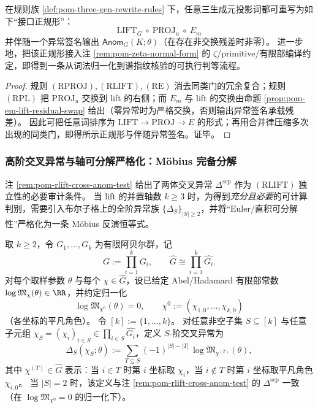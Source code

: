 \begin{proposition}\label{prop:pom-three-gen-interface-normal-form}
在规则族 \ref{def:pom-three-gen-rewrite-rules} 下，任意三生成元投影词都可重写为如下“接口正规形”：
$$
\boxed{\;
\mathrm{LIFT}_G\ \circ\ \mathrm{PROJ}_u\ \circ\ E_m
\;}
$$
并伴随一个异常签名输出 \(\mathsf{Anom}_G(K;\theta)\)（在存在非交换残差时非零）。
进一步地，把该正规形接入注 \ref{rem:pom-zeta-normal-form} 的 \(\zeta\)/primitive/有限部编译约定，即得到一条从词法归一化到谱指纹核验的可执行判等流程。
\end{proposition}

\begin{proof}
规则 \((\mathrm{RPROJ}),(\mathrm{RLIFT}),(\mathrm{RE})\) 消去同类门的冗余复合；规则 \((\mathrm{RPL})\) 把 \(\mathrm{PROJ}_u\) 交换到 lift 的右侧；而 \(E_m\) 与 lift 的交换由命题 \ref{prop:pom-em-lift-residual-swap} 给出（零异常时为严格交换，否则输出异常签名承载残差）。
因此可把任意词排序为 \(\mathrm{LIFT}\to \mathrm{PROJ}\to E\) 的形式；再用合并律压缩多次出现的同类门，即得所示正规形与伴随异常签名。证毕。
\end{proof}

\subsubsection{高阶交叉异常与轴可分解严格化：Möbius 完备分解}\label{subsec:pom-rlift-higher-cross-anom}

注 \ref{rem:pom-rlift-cross-anom-test} 给出了两体交叉异常 \(\Delta^{\mathrm{sep}}\) 作为 \((\mathrm{RLIFT})\) 独立性的必要审计条件。
当 lift 的并置轴数 \(k\ge 3\) 时，为得到\emph{充分且必要}的可计算判别，需要引入布尔子格上的全阶异常族 \(\{\Delta_S\}_{|S|\ge 2}\)，并将“Euler/直积可分解性”严格化为一条 Möbius 反演恒等式。

\begin{definition}\label{def:pom-higher-cross-anomaly}
取 \(k\ge 2\)，令 \(G_1,\dots,G_k\) 为有限阿贝尔群，记
\[
G:=\prod_{i=1}^k G_i,
\qquad
\widehat G\cong \prod_{i=1}^k \widehat{G_i}.
\]
对每个取样参数 \(\theta\) 与每个 \(\chi\in\widehat G\)，设已给定 Abel/Hadamard 有限部常数 \(\log\mathfrak{M}_{\chi}(\theta)\in\RR\)，并约定归一化
\[
\log\mathfrak{M}_{\chi^0}(\theta)=0,
\qquad
\chi^0:=(\chi_{1,0},\dots,\chi_{k,0})
\]
（各坐标的平凡角色）。
令 \([k]:=\{1,\dots,k\}\)。
对任意非空子集 \(S\subseteq[k]\) 与任意子元组 \(\chi_S=(\chi_i)_{i\in S}\in\prod_{i\in S}\widehat{G_i}\)，定义 \(S\)-阶交叉异常为
\[
\Delta_S(\chi_S;\theta)
:=\sum_{T\subseteq S}(-1)^{|S|-|T|}\,\log\mathfrak{M}_{\chi^{(T)}}(\theta),
\]
其中 \(\chi^{(T)}\in\widehat G\) 表示：当 \(i\in T\) 时第 \(i\) 坐标取 \(\chi_i\)，当 \(i\notin T\) 时第 \(i\) 坐标取平凡角色 \(\chi_{i,0}\)。
当 \(|S|=2\) 时，该定义与注 \ref{rem:pom-rlift-cross-anom-test} 的 \(\Delta^{\mathrm{sep}}\) 一致（在 \(\log\mathfrak{M}_{\chi^0}=0\) 的归一化下）。
\end{definition}

